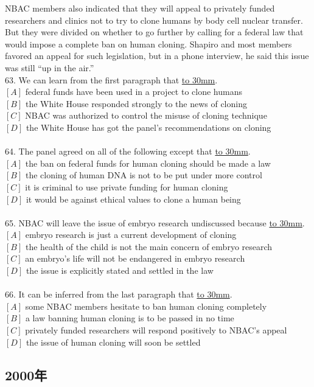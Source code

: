 \documentclass[a4paper]{article}
\begin{document}
\par
NBAC members also indicated that they will appeal to privately funded researchers and clinics not to try to clone humans by body cell nuclear transfer. But they were divided on whether to go further by calling for a federal law that would impose a complete ban on human cloning. Shapiro and most members favored an appeal for such legislation, but in a phone interview, he said this issue was still “up in the air.”
\\63.	We can learn from the first paragraph that \underline{\hbox to 30mm{}}.\\$[A]$ federal funds have been used in a project to clone humans\\$[B]$ the White House responded strongly to the news of cloning\\$[C]$ NBAC was authorized to control the misuse of cloning technique\\$[D]$ the White House has got the panel’s recommendations on cloning\\\\64.	The panel agreed on all of the following except that \underline{\hbox to 30mm{}}.\\$[A]$ the ban on federal funds for human cloning should be made a law\\$[B]$ the cloning of human DNA is not to be put under more control\\$[C]$ it is criminal to use private funding for human cloning\\$[D]$ it would be against ethical values to clone a human being\\\\65.	NBAC will leave the issue of embryo research undiscussed because \underline{\hbox to 30mm{}}.\\$[A]$ embryo research is just a current development of cloning\\$[B]$ the health of the child is not the main concern of embryo research\\$[C]$ an embryo’s life will not be endangered in embryo research\\$[D]$ the issue is explicitly stated and settled in the law\\\\66.	It can be inferred from the last paragraph that \underline{\hbox to 30mm{}}.\\$[A]$ some NBAC members hesitate to ban human cloning completely\\$[B]$ a law banning human cloning is to be passed in no time\\$[C]$ privately funded researchers will respond positively to NBAC’s appeal\\$[D]$ the issue of human cloning will soon be settled\\\subsection{2000年}
\end{document}
